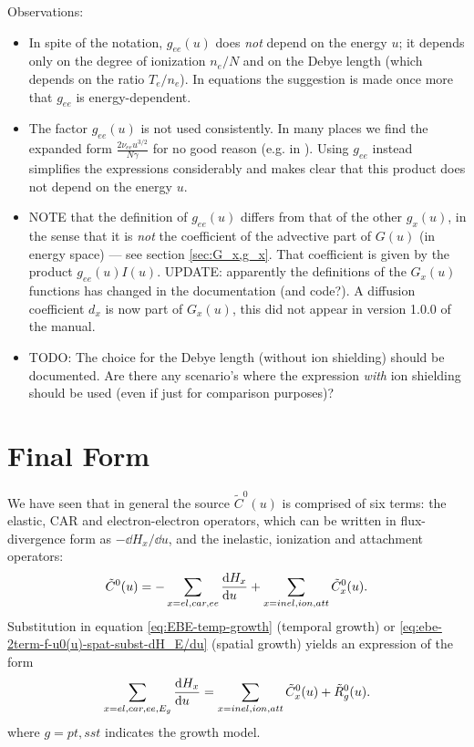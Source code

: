 \documentclass{book}
\begin{document}
Observations:
\begin{itemize}
  \item In spite of the notation, $g_{ee}(u)$ does {\em not} depend on the energy $u$;
    it depends only on the degree of ionization $n_e/N$ and on the Debye length
    (which depends on the ratio $T_e/n_e$). In equations \cite[39a--b]{Manual_2_2_0}
    the suggestion is made once more that $g_{ee}$ is energy-dependent.
  \item The factor $g_{ee}(u)$ is not used consistently. In many places we find
    the expanded form $\frac{2\nu_{ee}u^{3/2}}{N\gamma}$ for no good reason
    (e.g. in \cite[eqn. 39a-g]{Manual_2_2_0}).
    Using $g_{ee}$ instead simplifies the expressions considerably and makes clear
    that this product does not depend on the energy $u$.
  \item NOTE that the definition of $g_{ee}(u)$ differs from that of the other
    $g_x(u)$, in the sense that it is {\em not} the coefficient of the advective
    part of $G(u)$ (in energy space) --- see section \ref{sec:G_x,g_x}.
    That coefficient is given by the product $g_{ee}(u)I(u)$.
    UPDATE: apparently the definitions of the $G_x(u)$ functions has changed in the
	documentation (and code?). A diffusion coefficient $d_x$ is now part of
	$G_x(u)$, this did not appear in version 1.0.0 of the manual.
  \item TODO: The choice for the Debye length (without ion shielding) should be
    documented. Are there any scenario's where the expression {\em with} ion
    shielding should be used (even if just for comparison purposes)?
\end{itemize}

\section{Final Form}

We have seen that in general the source $ \tilde{C}^0(u)$ is comprised of six
terms: the elastic, CAR and electron-electron operators, which can be written
in flux-divergence form as $-\dd{H_x}/\dd{u}$, and the inelastic, ionization
and attachment operators:
\begin{equation}
	\tilde{C}^0(u) = -\sum\limits_{x=el,car,ee}\DERIV{H_x}{u} + \sum\limits_{x=inel,ion,att}\tilde{C}^0_{x}(u).
\end{equation}
Substitution in equation \eqref{eq:EBE-temp-growth} (temporal growth) or
\eqref{eq:ebe-2term-f-u0(u)-spat-subst-dH_E/du} (spatial growth) yields an
expression of the form
\begin{equation}
	\sum\limits_{x=el,car,ee,E_g}\DERIV{H_x}{u}
	=
	\sum\limits_{x=inel,ion,att}\tilde{C}^0_{x}(u)
	+
	\tilde{R}^0_g(u).
	\label{eq:EBE-final}
\end{equation}
where $g=pt,sst$ indicates the growth model.
\end{document}
